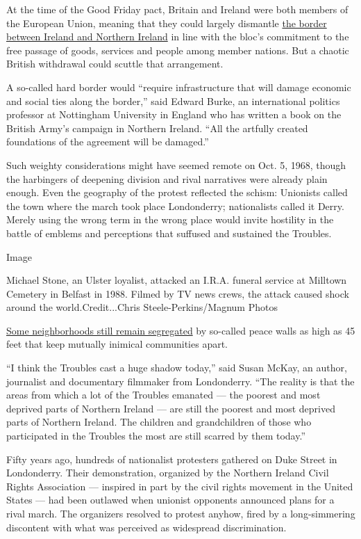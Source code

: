 At the time of the Good Friday pact, Britain and Ireland were both
members of the European Union, meaning that they could largely dismantle
\href{https://www.nytimes.com/2016/08/07/world/europe/a-question-lingers-on-the-irish-british-border-whats-next.html}{the
border between Ireland and Northern Ireland} in line with the bloc's
commitment to the free passage of goods, services and people among
member nations. But a chaotic British withdrawal could scuttle that
arrangement.

A so-called hard border would ``require infrastructure that will damage
economic and social ties along the border,'' said Edward Burke, an
international politics professor at Nottingham University in England who
has written a book on the British Army's campaign in Northern Ireland.
``All the artfully created foundations of the agreement will be
damaged.''

Such weighty considerations might have seemed remote on Oct. 5, 1968,
though the harbingers of deepening division and rival narratives were
already plain enough. Even the geography of the protest reflected the
schism: Unionists called the town where the march took place
Londonderry; nationalists called it Derry. Merely using the wrong term
in the wrong place would invite hostility in the battle of emblems and
perceptions that suffused and sustained the Troubles.

Image

Michael Stone, an Ulster loyalist, attacked an I.R.A. funeral service at
Milltown Cemetery in Belfast in 1988. Filmed by TV news crews, the
attack caused shock around the world.Credit...Chris
Steele-Perkins/Magnum Photos

\href{https://www.nytimes.com/2017/10/11/world/europe/belfast-catholics-protestants-cantrell-close.html}{Some
neighborhoods still remain segregated} by so-called peace walls as high
as 45 feet that keep mutually inimical communities apart.

``I think the Troubles cast a huge shadow today,'' said Susan McKay, an
author, journalist and documentary filmmaker from Londonderry. ``The
reality is that the areas from which a lot of the Troubles emanated ---
the poorest and most deprived parts of Northern Ireland --- are still
the poorest and most deprived parts of Northern Ireland. The children
and grandchildren of those who participated in the Troubles the most are
still scarred by them today.''

Fifty years ago, hundreds of nationalist protesters gathered on Duke
Street in Londonderry. Their demonstration, organized by the Northern
Ireland Civil Rights Association --- inspired in part by the civil
rights movement in the United States --- had been outlawed when unionist
opponents announced plans for a rival march. The organizers resolved to
protest anyhow, fired by a long-simmering discontent with what was
perceived as widespread discrimination.


